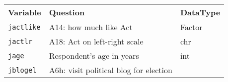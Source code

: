 \documentclass[]{article}
\begin{document}
\begin{longtable}[]{@{}lll@{}}
\toprule
\begin{minipage}[b]{0.14\columnwidth}\raggedright\strut
Variable\strut
\end{minipage} & \begin{minipage}[b]{0.70\columnwidth}\raggedright\strut
Question\strut
\end{minipage} & \begin{minipage}[b]{0.08\columnwidth}\raggedright\strut
DataType\strut
\end{minipage}\tabularnewline
\midrule
\endhead
\begin{minipage}[t]{0.14\columnwidth}\raggedright\strut
\texttt{jactlike}\strut
\end{minipage} & \begin{minipage}[t]{0.70\columnwidth}\raggedright\strut
A14: how much like Act\strut
\end{minipage} & \begin{minipage}[t]{0.08\columnwidth}\raggedright\strut
Factor\strut
\end{minipage}\tabularnewline
\begin{minipage}[t]{0.14\columnwidth}\raggedright\strut
\texttt{jactlr}\strut
\end{minipage} & \begin{minipage}[t]{0.70\columnwidth}\raggedright\strut
A18: Act on left-right scale\strut
\end{minipage} & \begin{minipage}[t]{0.08\columnwidth}\raggedright\strut
chr\strut
\end{minipage}\tabularnewline
\begin{minipage}[t]{0.14\columnwidth}\raggedright\strut
\texttt{jage}\strut
\end{minipage} & \begin{minipage}[t]{0.70\columnwidth}\raggedright\strut
Respondent's age in years\strut
\end{minipage} & \begin{minipage}[t]{0.08\columnwidth}\raggedright\strut
int\strut
\end{minipage}\tabularnewline
\begin{minipage}[t]{0.14\columnwidth}\raggedright\strut
\texttt{jblogel}\strut
\end{minipage} & \begin{minipage}[t]{0.70\columnwidth}\raggedright\strut
A6h: visit political blog for election\strut
\end{minipage} & \begin{minipage}[t]{0.08\columnwidth}\raggedright\strut

\end{minipage}
\end{longtable}
\end{document}
